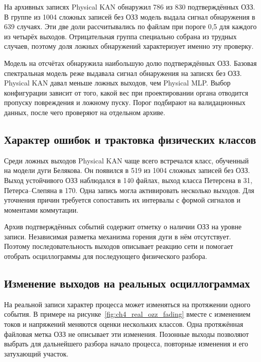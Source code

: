 На архивных записях Physical KAN обнаружил 786 из 830 подтверждённых ОЗЗ. В группе из
1004 сложных записей без ОЗЗ модель выдала сигнал обнаружения в 639 случаях. Эти две
доли рассчитывались по файлам при пороге 0,5 для каждого из четырёх выходов.
Отрицательная группа специально собрана из трудных случаев, поэтому доля ложных
обнаружений характеризует именно эту проверку.

Модель на отсчётах обнаружила наибольшую долю подтверждённых ОЗЗ. Базовая спектральная
модель реже выдавала сигнал обнаружения на записях без ОЗЗ. Physical KAN давал меньше
ложных выходов, чем Physical MLP. Выбор конфигурации зависит от того, какой вес при
проектировании органа отводится пропуску повреждения и ложному пуску. Порог подбирают на
валидационных данных, после чего проверяют на отдельном архиве.

\subsection{Характер ошибок и трактовка физических классов}
\label{sec:ch4_ozz_errors}


Среди ложных выходов Physical KAN чаще всего встречался класс, обученный на модели дуги
Белякова. Он появился в 519 из 1004 сложных записей без ОЗЗ. Выход устойчивого ОЗЗ
наблюдался в 140 файлах, выход класса Петерсена в 31, Петерса--Слепяна в 170. Одна
запись могла активировать несколько выходов. Для уточнения причин требуется сопоставить
их интервалы с формой сигналов и моментами коммутации.

Архив подтверждённых событий содержит отметку о наличии ОЗЗ на уровне записи.
Независимая разметка механизма горения дуги в нём отсутствует. Поэтому
последовательность выходов описывает реакцию сети и помогает отобрать осциллограммы для
последующего физического разбора.

\subsection{Изменение выходов на реальных осциллограммах}
\label{sec:ch4_ozz_real_examples}

На реальной записи характер процесса может изменяться
на протяжении одного события.
В примере на рисунке~\ref{fig:ch4_real_ozz_fading}
вместе с изменением токов и напряжений меняются
оценки нескольких классов. Одна протяжённая файловая
метка ОЗЗ не описывает эти изменения.
Позонные выходы позволяют выбрать для дальнейшего
разбора начало процесса, повторные изменения
и его затухающий участок.

